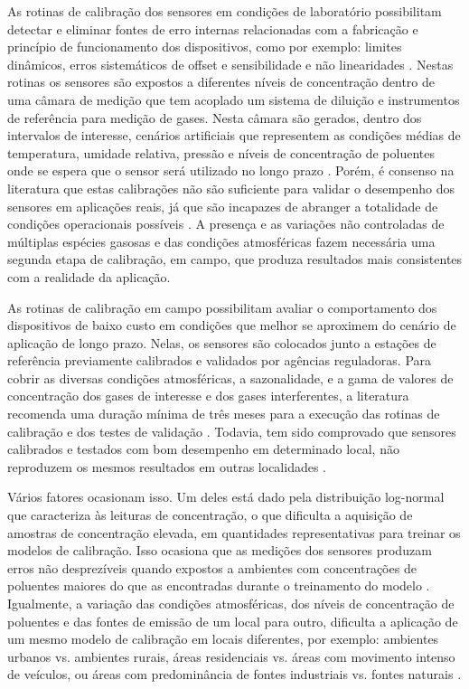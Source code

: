 As rotinas de calibração dos sensores em condições de laboratório possibilitam detectar e eliminar fontes de erro internas relacionadas com a fabricação e princípio de funcionamento dos dispositivos, como por exemplo: limites dinâmicos, erros sistemáticos de offset e sensibilidade e não linearidades \cite{Spinelle2013ProtocolPollution}. Nestas rotinas os sensores são expostos a diferentes níveis de concentração dentro de uma câmara de medição que tem acoplado um sistema de diluição e instrumentos de referência para medição de gases. Nesta câmara são gerados, dentro dos intervalos de interesse, cenários artificiais que representem as condições médias de temperatura, umidade relativa, pressão e níveis de concentração de poluentes onde se espera que o sensor será utilizado no longo prazo \cite{Spinelle2013ProtocolPollution}.
Porém, é consenso na literatura que estas calibrações não são suficiente para validar o desempenho dos sensores em aplicações reais, já que são incapazes de abranger a totalidade de condições operacionais possíveis \cite{Maag2018ADeployments,Lewis2018Low-costApplications,Morawska2018ApplicationsGone}. A presença e as variações não controladas de múltiplas espécies gasosas e das condições atmosféricas fazem necessária uma segunda etapa de calibração, em campo, que produza resultados mais consistentes com a realidade da aplicação.

As rotinas de calibração em campo possibilitam avaliar o comportamento dos dispositivos de baixo custo em condições que melhor se aproximem do cenário de aplicação de longo prazo. Nelas, os sensores são colocados junto a estações de referência previamente calibrados e validados por agências reguladoras. Para cobrir as diversas condições atmosféricas, a sazonalidade, e a gama de valores de concentração dos gases de interesse e dos gases interferentes, a literatura recomenda uma duração mínima de três meses para a execução das rotinas de calibração e dos testes de validação \cite{Spinelle2013ProtocolPollution}. Todavia, tem sido comprovado que sensores calibrados e testados com bom desempenho em determinado local, não reproduzem os mesmos resultados em outras localidades \cite{Zimmerman2018AMonitoring,Hagan2018CalibrationInstruments,Concas2019ACalibration}.

Vários fatores ocasionam isso. Um deles está dado pela distribuição log-normal que caracteriza às leituras de concentração, o que dificulta a aquisição de amostras de concentração elevada, em quantidades representativas para treinar os modelos de calibração. Isso ocasiona que as medições dos sensores produzam erros não desprezíveis quando expostos a ambientes com concentrações de poluentes maiores do que as encontradas durante o treinamento do modelo \cite{Zimmerman2018AMonitoring}. 
Igualmente, a variação das condições atmosféricas, dos níveis de concentração de poluentes e das fontes de emissão de um local para outro, dificulta a aplicação de um mesmo modelo de calibração em locais diferentes, por exemplo: ambientes urbanos vs. ambientes rurais, áreas residenciais vs. áreas com movimento intenso de veículos, ou áreas com predominância de fontes industriais vs. fontes naturais \cite{Hagan2018CalibrationInstruments,Zimmerman2018AMonitoring}.

